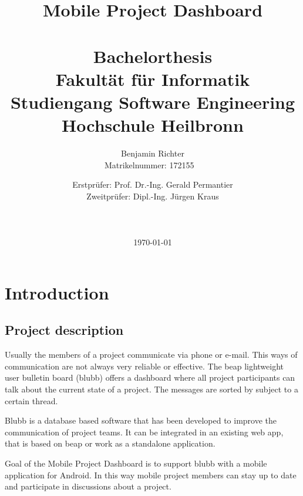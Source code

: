 \documentclass[12pt,a4paper,oneside]{report}
\begin{document}
%
\title{
	{\huge \textbf{Mobile Project Dashboard}}
	{\\ ~\\ \large \textbf{Bachelorthesis}}
	{\\ \large Fakultät für Informatik}
	{\\ \large Studiengang Software Engineering}
	{\\ \large Hochschule Heilbronn}
}
\author{Benjamin Richter\\ Matrikelnummer: 172155 ~\\}
\date{Erstprüfer: Prof. Dr.-Ing. Gerald Permantier\\Zweitprüfer: Dipl.-Ing. Jürgen Kraus\\ ~\\ ~\\ ~\\ \today }

\begingroup
\let\center\flushleft
\let\endcenter\endflushleft
\maketitle
\endgroup

\tableofcontents
\listoffigures

\chapter{Introduction}
\section{Project description}
Usually the members of a project communicate via phone or e-mail. This ways of communication are not always very reliable or effective. The beap lightweight user bulletin board (blubb) offers a dashboard where all project participants can talk about the current state of a project. The messages are sorted by subject to a certain thread.

Blubb is a database based software that has been developed to improve the communication of project teams. It can be integrated in an existing web app, that is based on beap or work as a standalone application. 

Goal of the Mobile Project Dashboard is to support blubb with a mobile application for Android. In this way mobile project members can stay up to date and participate in discussions about a project.
\end{document}
